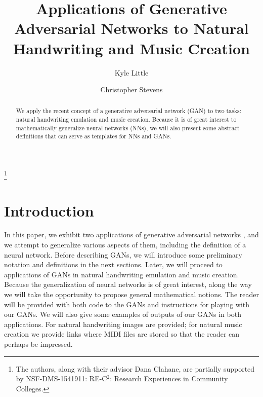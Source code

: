 \documentclass[12pt]{amsart}
\theoremstyle{definition}
\theoremstyle{remark}
\begin{document}
\title[Applications of Generative Adversarial Networks]{Applications of Generative Adversarial Networks to Natural Handwriting and Music Creation}

\thanks{
The authors, along with their advisor Dana Clahane, are partially supported by 
NSF-DMS-1541911: RE-C$^2$: Research Experiences in Community Colleges.
}

\author[K.Little]{Kyle Little}

\author[C.Stevens]{Christopher Stevens}

\address{ Mathematics and Computer Science Division, \newline
        Fullerton College, 321 E. Chapman, Fullerton, CA 92832-2095
}

\begin{abstract}
We apply the recent concept of a generative adversarial network (GAN) to two tasks:
natural handwriting emulation and music creation. Because it is of great interest
to mathematically generalize neural networks (NNs), we will also present some 
abstract definitions that can serve as templates for NNs and GANs.
\end{abstract} 

\maketitle
\section{Introduction}

In this paper, we exhibit two applications of generative adversarial 
networks \cite{1406.2661}, and we attempt to generalize various aspects of them,
including the definition of a neural network. Before describing GANs, we will 
introduce some preliminary notation and definitions in the next sections. Later, 
we will proceed to applications of GANs in natural handwriting emulation and music 
creation. Because the generalization of neural networks is of great interest, 
along the way we will take the opportunity to propose general mathematical notions.
The reader will be provided with both code to the GANs and instructions for playing with our GANs.
We will also give some examples of outputs of our GANs in both applications.
For natural handwriting images are provided; for natural music creation
we provide links where MIDI files are stored so that the reader can perhaps be impressed.
\end{document}
